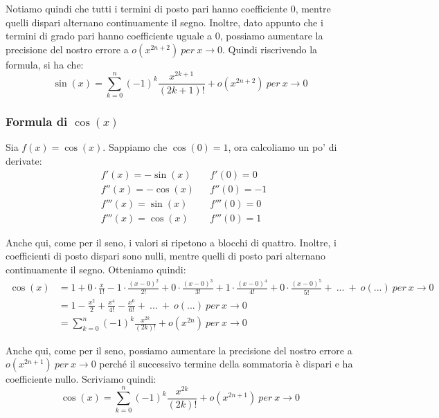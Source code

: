 \documentclass{article}
\begin{document}
\noindent Notiamo quindi che tutti i termini di posto pari hanno coefficiente $0$, mentre quelli dispari alternano continuamente il segno. Inoltre, dato appunto che i termini di grado pari hanno coefficiente uguale a $0$, possiamo aumentare la precisione del nostro errore a $o(x^{2n + 2}) \ per \ x \to 0$. Quindi riscrivendo la formula, si ha che:
\begin{equation*}
    \sin(x) = \sum_{k = 0}^n (-1)^k \frac{x^{2k + 1}}{(2k + 1)!} + o(x^{2n + 2}) \ per \ x \to 0
\end{equation*}

\subsubsection{Formula di $\cos(x)$}
Sia $f(x) = \cos(x)$. Sappiamo che $\cos(0) = 1$, ora calcoliamo un po' di derivate:
\begin{align*}
    & f'(x) = -\sin(x) && f'(0) = 0 \\
    & f''(x) = -\cos(x) && f''(0) = -1 \\
    & f'''(x) = \sin(x) && f'''(0) = 0 \\
    & f'''(x) = \cos(x) && f'''(0) = 1
\end{align*}

\noindent Anche qui, come per il seno, i valori si ripetono a blocchi di quattro. Inoltre, i coefficienti di posto dispari sono nulli, mentre quelli di posto pari alternano continuamente il segno. Otteniamo quindi:
\begin{align*}
    \cos(x) &= 1 + 0 \cdot \frac{x}{1!} - 1 \cdot \frac{(x - 0)^2}{2!} + 0 \cdot \frac{(x - 0)^3}{3!} + 1 \cdot \frac{(x - 0)^4}{4!} + 0 \cdot \frac{(x - 0)^5}{5!} + \ ... \ + \ o(...) \ per \ x \to 0 \\
    &= 1 - \frac{x^2}{2} + \frac{x^4}{4!} - \frac{x^6}{6!} + \ ... \ + \ o(...) \ per \ x \to 0 \\
    &= \sum_{k = 0}^n (-1)^k \frac{x^{2k}}{(2k)!} + o(x^{2n}) \ per \ x \to 0
\end{align*}

\noindent Anche qui, come per il seno, possiamo aumentare la precisione del nostro errore a $o(x^{2n + 1}) \ per \ x \to 0$ perché il successivo termine della sommatoria è dispari e ha coefficiente nullo. Scriviamo quindi:
\begin{equation*}
    \cos(x) = \sum_{k = 0}^n (-1)^k \frac{x^{2k}}{(2k)!} + o(x^{2n + 1}) \ per \ x \to 0
\end{equation*}
\end{document}

